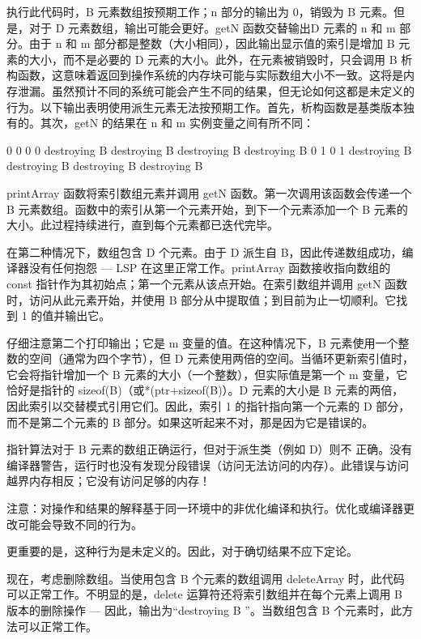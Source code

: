 执行此代码时，B 元素数组按预期工作；n 部分的输出为 0，销毁为 B 元素。但是，对于 D 元素数组，输出可能会更好。getN 函数交替输出D 元素的 n 和 m 部分。由于 n 和 m 部分都是整数（大小相同），因此输出显示值的索引是增加 B 元素的大小，而不是必要的 D 元素的大小。此外，在元素被销毁时，只会调用 B 析构函数，这意味着返回到操作系统的内存块可能与实际数组大小不一致。这将是内存泄漏。虽然预计不同的系统可能会产生不同的结果，但无论如何这都是未定义的行为。以下输出表明使用派生元素无法按预期工作。首先，析构函数是基类版本独有的。其次，getN 的结果在 n 和 m 实例变量之间有所不同：

\begin{shell}
0
0
0
0
destroying B
destroying B
destroying B
destroying B
0
1
0
1
destroying B
destroying B
destroying B
destroying B
\end{shell}


printArray 函数将索引数组元素并调用 getN 函数。第一次调用该函数会传递一个 B 元素数组。函数中的索引从第一个元素开始，到下一个元素添加一个 B 元素的大小。此过程持续进行，直到每个元素都已迭代完毕。

在第二种情况下，数组包含 D 个元素。由于 D 派生自 B，因此传递数组成功，编译器没有任何抱怨 — LSP 在这里正常工作。printArray 函数接收指向数组的 const 指针作为其初始点；第一个元素从该点开始。在索引数组并调用 getN 函数时，访问从此元素开始，并使用 B 部分从中提取值；到目前为止一切顺利。它找到 1 的值并输出它。

仔细注意第二个打印输出；它是 m 变量的值。在这种情况下，B 元素使用一个整数的空间（通常为四个字节），但 D 元素使用两倍的空间。当循环更新索引值时，它会将指针增加一个 B 元素的大小（一个整数），但实际值是第一个 m 变量，它恰好是指针的 sizeof(B)（或*(ptr+sizeof(B)）。D 元素的大小是 B 元素的两倍，因此索引以交替模式引用它们。因此，索引 1 的指针指向第一个元素的 D 部分，而不是第二个元素的 B 部分。如果这听起来不对，那是因为它是错误的。

指针算法对于 B 元素的数组正确运行，但对于派生类（例如 D）则不 正确。没有编译器警告，运行时也没有发现分段错误（访问无法访问的内存）。此错误与访问越界内存相反；它没有访问足够的内存！

注意：对操作和结果的解释基于同一环境中的非优化编译和执行。优化或编译器更改可能会导致不同的行为。

更重要的是，这种行为是未定义的。因此，对于确切结果不应下定论。

现在，考虑删除数组。当使用包含 B 个元素的数组调用 deleteArray 时，此代码可以正常工作。不明显的是，delete 运算符还将索引数组并在每个元素上调用 B 版本的删除操作 — 因此，输出为“destroying B ”。当数组包含 B 个元素时，此方法可以正常工作。

